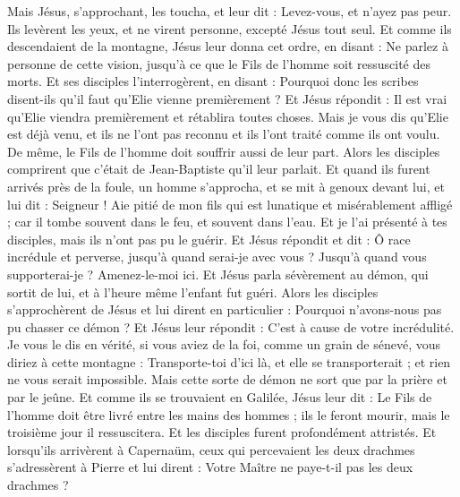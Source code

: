 \begin{multicols}{2}
{Mais Jésus, s'approchant, les toucha, et leur dit : Levez-vous, et n'ayez pas peur.
Ils levèrent les yeux, et ne virent personne, excepté Jésus tout seul.
Et comme ils descendaient de la montagne, Jésus leur donna cet ordre, en disant : Ne parlez à personne de cette vision, jusqu'à ce que le Fils de l'homme soit ressuscité des morts.
Et ses disciples l'interrogèrent, en disant : Pourquoi donc les scribes disent-ils qu'il faut qu'Elie vienne premièrement ?
Et Jésus répondit : Il est vrai qu'Elie viendra premièrement et rétablira toutes choses.
Mais je vous dis qu'Elie est déjà venu, et ils ne l'ont pas reconnu et ils l’ont traité comme ils ont voulu. De même, le Fils de l'homme doit souffrir aussi de leur part.
Alors les disciples comprirent que c'était de Jean-Baptiste qu'il leur parlait.
Et quand ils furent arrivés près de la foule, un homme s'approcha, et se mit à genoux devant lui,
et lui dit : Seigneur ! Aie pitié de mon fils qui est lunatique et misérablement affligé ; car il tombe souvent dans le feu, et souvent dans l'eau.
Et je l'ai présenté à tes disciples, mais ils n’ont pas pu le guérir.
Et Jésus répondit et dit : Ô race incrédule et perverse, jusqu’à quand serai-je avec vous ? Jusqu’à quand vous supporterai-je ? Amenez-le-moi ici.
Et Jésus parla sévèrement au démon, qui sortit de lui, et à l'heure même l'enfant fut guéri.
Alors les disciples s’approchèrent de Jésus et lui dirent en particulier : Pourquoi n’avons-nous pas pu chasser ce démon ?
Et Jésus leur répondit : C'est à cause de votre incrédulité. Je vous le dis en vérité, si vous aviez de la foi, comme un grain de sénevé, vous diriez à cette montagne : Transporte-toi d'ici là, et elle se transporterait ; et rien ne vous serait impossible.
Mais cette sorte de démon ne sort que par la prière et par le jeûne.
Et comme ils se trouvaient en Galilée, Jésus leur dit : Le Fils de l'homme doit être livré entre les mains des hommes ;
ils le feront mourir, mais le troisième jour il ressuscitera. Et les disciples furent profondément attristés.
Et lorsqu'ils arrivèrent à Capernaüm, ceux qui percevaient les deux drachmes s'adressèrent à Pierre et lui dirent : Votre Maître ne paye-t-il pas les deux drachmes ?
}
\end{multicols}
